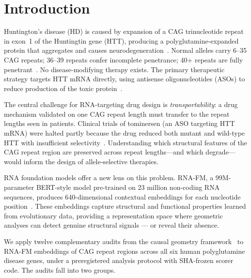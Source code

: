 \documentclass[11pt]{article}
\begin{document}
\section{Introduction}
\label{sec:intro}

Huntington's disease (HD) is caused by expansion of a CAG trinucleotide
repeat in exon~1 of the Huntingtin gene (HTT), producing a
polyglutamine-expanded protein that aggregates and causes
neurodegeneration~\citep{macdonald1993}.
Normal alleles carry 6--35 CAG repeats; 36--39 repeats confer incomplete
penetrance; 40+ repeats are fully penetrant~\citep{rubinsztein1996}.
No disease-modifying therapy exists. The primary therapeutic strategy
targets HTT mRNA directly, using antisense oligonucleotides (ASOs) to
reduce production of the toxic protein~\citep{tabrizi2019}.

The central challenge for RNA-targeting drug design is \emph{transportability}:
a drug mechanism validated on one CAG repeat length must transfer to the
repeat lengths seen in patients. Clinical trials of tominersen
(an ASO targeting HTT mRNA) were halted partly because the drug reduced
both mutant and wild-type HTT with insufficient selectivity~\citep{tabrizi2022}.
Understanding which structural features of the CAG repeat region are
preserved across repeat lengths---and which degrade---would inform
the design of allele-selective therapies.

RNA foundation models offer a new lens on this problem. RNA-FM, a
99M-parameter BERT-style model pre-trained on 23 million non-coding RNA
sequences, produces 640-dimensional contextual embeddings for each
nucleotide position~\citep{rnafm}. These embeddings
capture structural and functional properties learned from evolutionary
data, providing a representation space where geometric analyses can
detect genuine structural signals --- or reveal their absence.

We apply twelve complementary audits from the causal geometry
framework~\citep{tower2026bn,tower2026grass}
to RNA-FM embeddings of CAG repeat regions across all six human
polyglutamine disease genes, under a preregistered analysis protocol
with SHA-frozen scorer code. The audits fall into two groups.
\end{document}
